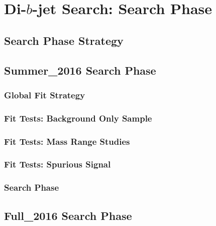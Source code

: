 \chapter{Di-$b$-jet Search: Search Phase}
\label{sec:bkg}

\section{Search Phase Strategy}
\label{sec:bkg-strat}

\section{Summer\_2016 Search Phase}
\label{sec:bkg-summer}

\subsection{Global Fit Strategy}
\label{sec:bkg-summer_global}

\subsection{Fit Tests: Background Only Sample}
\label{sec:bkg-summer_fitCR}

\subsection{Fit Tests: Mass Range Studies}
\label{sec:bkg-summer_range}


\subsection{Fit Tests: Spurious Signal}
\label{sec:bkg-summer_spusig}

\subsection{Search Phase}
\label{sec:bkg-summer_results}

\section{Full\_2016 Search Phase}
\label{sec:bkg-full}
